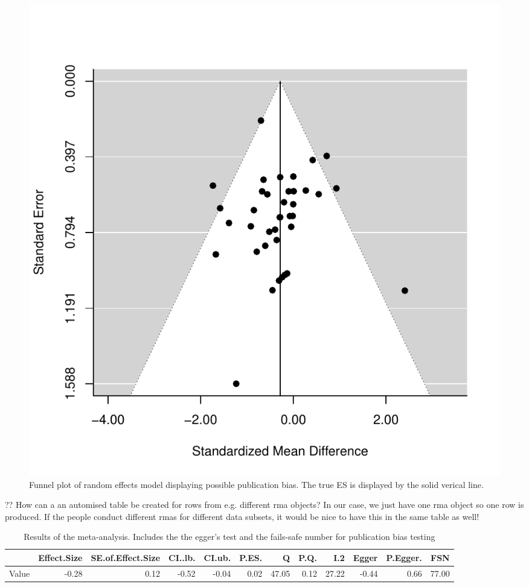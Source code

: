\documentclass[11pt, a4paper]{article} %
\begin{document}
\begin{figure} 
\captionsetup{width = 0.6\textwidth}
\centering
\includegraphics{newsweave-funnelplot}
\caption{Funnel plot of random effects model displaying possible publication bias. The true ES is displayed by the solid verical line.}
\end{figure}


?? How can a an automised table be created for rows from e.g. different rma objects? In our case, we just have one rma object so one row is produced. If the people conduct different rmas for different data subsets, it would be nice to have this in the same table as well!  




\begin{table}[ht]
\centering
{\footnotesize
\begin{tabular}{rrrrrrrrrrrr}
  \hline
 & Effect.Size & SE.of.Effect.Size & CI..lb. & CI.ub. & P.ES. & Q & P.Q. & I.2 & Egger & P.Egger. & FSN \\ 
  \hline
Value & -0.28 & 0.12 & -0.52 & -0.04 & 0.02 & 47.05 & 0.12 & 27.22 & -0.44 & 0.66 & 77.00 \\ 
   \hline
\end{tabular}
}
\caption{Results of the meta-analysis. Includes the the egger's test and the fails-safe number for publication bias testing} 
\end{table}
\end{document}
